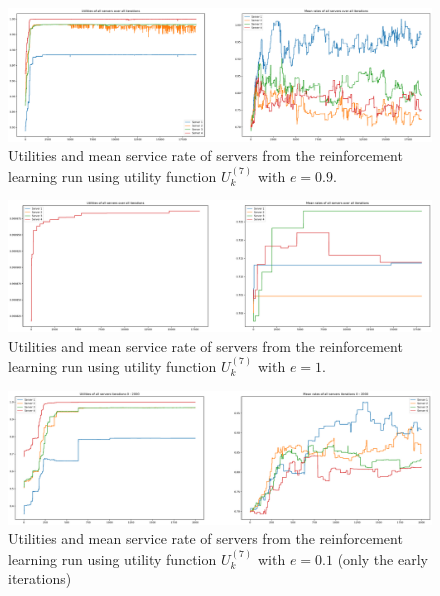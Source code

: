 \begin{figure}[H]
    \includegraphics[width=\textwidth]{chapters/00_appendix/03_more_rl_results/Bin/utility_7_eps/u7_1_e09.eps}
    \caption{Utilities and mean service rate of servers from the reinforcement
    learning run using utility function \(U_k^{(7)}\) with \(e = 0.9\).}
    \label{fig:RL_utility7_1_e09}
\end{figure}

\begin{figure}[H]
    \includegraphics[width=\textwidth]{chapters/00_appendix/03_more_rl_results/Bin/utility_7_eps/u7_1_e1.eps}
    \caption{Utilities and mean service rate of servers from the reinforcement
    learning run using utility function \(U_k^{(7)}\) with \(e = 1\).}
    \label{fig:RL_utility7_1_e1}
\end{figure}

\begin{figure}[H]
    \includegraphics[width=\textwidth]{chapters/00_appendix/03_more_rl_results/Bin/utility_7_eps/u7_2_e01_early_iter.eps}
    \caption{Utilities and mean service rate of servers from the reinforcement
    learning run using utility function \(U_k^{(7)}\) with \(e = 0.1\) (only
    the early iterations)}
    \label{fig:RL_utility7_2_e01_early_iter}
\end{figure}

